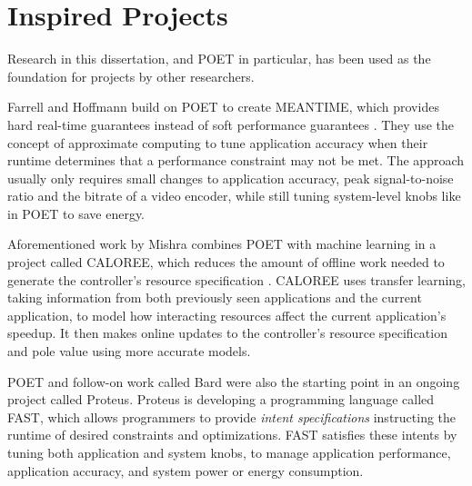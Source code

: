\section{Inspired Projects}
\label{sec:related-inspired}

Research in this dissertation, and POET in particular, has been used as the foundation for projects by other researchers.

Farrell and Hoffmann build on POET to create MEANTIME, which provides hard real-time guarantees instead of soft performance guarantees \cite{meantime}.
They use the concept of approximate computing to tune application accuracy when their runtime determines that a performance constraint may not be met.
The approach usually only requires small changes to application accuracy, \eg peak signal-to-noise ratio and the bitrate of a video encoder, while still tuning system-level knobs like in POET to save energy.

Aforementioned work by Mishra \etal combines POET with machine learning in a project called CALOREE, which reduces the amount of offline work needed to generate the controller's resource specification \cite{CALOREE}.
CALOREE uses transfer learning, taking information from both previously seen applications and the current application, to model how interacting resources affect the current application's speedup.
It then makes online updates to the controller's resource specification and pole value using more accurate models.

POET and follow-on work called Bard were also the starting point in an ongoing project called Proteus.
Proteus is developing a programming language called FAST, which allows programmers to provide \emph{intent specifications} instructing the runtime of desired constraints and optimizations.
FAST satisfies these intents by tuning both application and system knobs, \eg to manage application performance, application accuracy, and system power or energy consumption.
